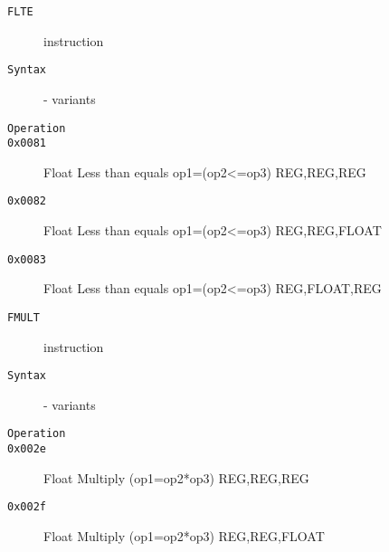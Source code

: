 \clearpage
\begin{description}
\item[\texttt{FLTE}] instruction\\
\item[\texttt{Syntax}] - variants\\

\item[\texttt{Operation}]
\item[\texttt{}]
\item[\texttt{0x0081}] Float Less than equals op1=(op2<=op3)  {REG,REG,REG}       \\
\item[\texttt{0x0082}] Float Less than equals op1=(op2<=op3)  {REG,REG,FLOAT}     \\
\item[\texttt{0x0083}] Float Less than equals op1=(op2<=op3)  {REG,FLOAT,REG}     \\
\end{description}
\clearpage
\begin{description}
\item[\texttt{FMULT}] instruction\\
\item[\texttt{Syntax}] - variants\\

\item[\texttt{Operation}]
\item[\texttt{}]
\item[\texttt{0x002e}] Float Multiply (op1=op2*op3)  {REG,REG,REG}       \\
\item[\texttt{0x002f}] Float Multiply (op1=op2*op3)  {REG,REG,FLOAT}     \\
\end{description}
